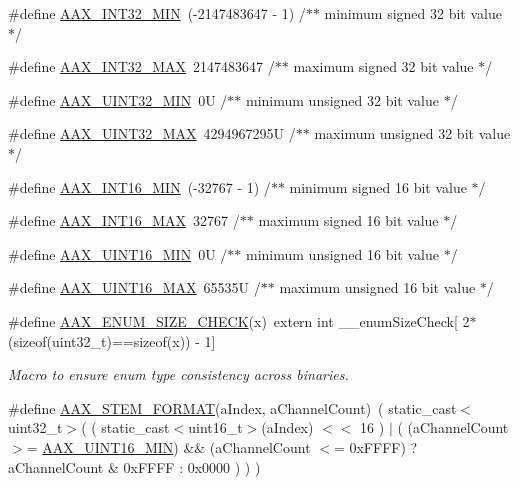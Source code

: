 \begin{DoxyCompactItemize}
\item 
\#define \mbox{\hyperlink{a00491_ae7543e71654aff007dd5e118f550ade4}{A\+A\+X\+\_\+\+I\+N\+T32\+\_\+\+M\+IN}}~(-\/2147483647 -\/ 1) /$\ast$$\ast$ minimum signed 32 bit value $\ast$/
\item 
\#define \mbox{\hyperlink{a00491_a3f56ffc36648f848d952971b79e6058e}{A\+A\+X\+\_\+\+I\+N\+T32\+\_\+\+M\+AX}}~2147483647      /$\ast$$\ast$ maximum signed 32 bit value $\ast$/
\item 
\#define \mbox{\hyperlink{a00491_ac15bf852c0f424d26e5d192cd071cea5}{A\+A\+X\+\_\+\+U\+I\+N\+T32\+\_\+\+M\+IN}}~0\+U              /$\ast$$\ast$ minimum unsigned 32 bit value $\ast$/
\item 
\#define \mbox{\hyperlink{a00491_a5c6762a806e44dae7db7626d540abdc6}{A\+A\+X\+\_\+\+U\+I\+N\+T32\+\_\+\+M\+AX}}~4294967295\+U     /$\ast$$\ast$ maximum unsigned 32 bit value $\ast$/
\item 
\#define \mbox{\hyperlink{a00491_a5fb7a4c8971daed2c77c94f7b380cd3e}{A\+A\+X\+\_\+\+I\+N\+T16\+\_\+\+M\+IN}}~(-\/32767 -\/ 1)      /$\ast$$\ast$ minimum signed 16 bit value $\ast$/
\item 
\#define \mbox{\hyperlink{a00491_a2dd148d32d76447c468cf8a46a27f091}{A\+A\+X\+\_\+\+I\+N\+T16\+\_\+\+M\+AX}}~32767           /$\ast$$\ast$ maximum signed 16 bit value $\ast$/
\item 
\#define \mbox{\hyperlink{a00491_a8ceb2c21f1d6aa31c5f90b0a03d5d7e6}{A\+A\+X\+\_\+\+U\+I\+N\+T16\+\_\+\+M\+IN}}~0\+U              /$\ast$$\ast$ minimum unsigned 16 bit value $\ast$/
\item 
\#define \mbox{\hyperlink{a00491_a3bf68155d417d346f54d7dc96bf6a486}{A\+A\+X\+\_\+\+U\+I\+N\+T16\+\_\+\+M\+AX}}~65535\+U          /$\ast$$\ast$ maximum unsigned 16 bit value $\ast$/
\item 
\#define \mbox{\hyperlink{a00491_ad3064f7b1f2c3903562d5475dcb04eec}{A\+A\+X\+\_\+\+E\+N\+U\+M\+\_\+\+S\+I\+Z\+E\+\_\+\+C\+H\+E\+CK}}(x)~extern int \+\_\+\+\_\+enum\+Size\+Check\mbox{[} 2$\ast$(sizeof(uint32\+\_\+t)==sizeof(x)) -\/ 1\mbox{]}
\begin{DoxyCompactList}\small\item\em Macro to ensure enum type consistency across binaries. \end{DoxyCompactList}\item 
\#define \mbox{\hyperlink{a00491_a49ce720dc4840f983ca0f3d4d1fd2e9a}{A\+A\+X\+\_\+\+S\+T\+E\+M\+\_\+\+F\+O\+R\+M\+AT}}(a\+Index,  a\+Channel\+Count)~( static\+\_\+cast$<$uint32\+\_\+t$>$( ( static\+\_\+cast$<$uint16\+\_\+t$>$(a\+Index) $<$$<$ 16 ) $\vert$ ( (a\+Channel\+Count $>$= \mbox{\hyperlink{a00491_a8ceb2c21f1d6aa31c5f90b0a03d5d7e6}{A\+A\+X\+\_\+\+U\+I\+N\+T16\+\_\+\+M\+IN}}) \&\& (a\+Channel\+Count $<$= 0x\+F\+F\+F\+F) ? a\+Channel\+Count \& 0x\+F\+F\+F\+F \+: 0x0000 ) ) )
$$
\end{DoxyCompactItemize}
